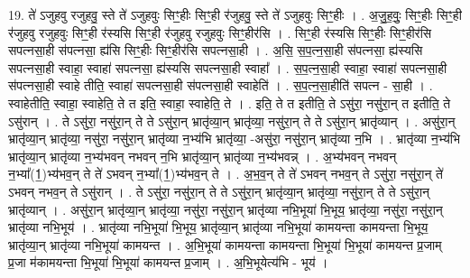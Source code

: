 \documentclass[17pt]{extarticle}
\begin{document}
19. ते॑ ऽजुहवु रजुहवु॒ स्ते ते॑ ऽजुहवुः सिꣳ॒॒हीः सिꣳ॒॒ही र॑जुहवु॒ स्ते ते॑ ऽजुहवुः सिꣳ॒॒हीः । . अ॒जु॒ह॒वुः॒ सिꣳ॒॒हीः सिꣳ॒॒ही र॑जुहवु रजुहवुः सिꣳ॒॒ही र॑स्यसि सिꣳ॒॒ही र॑जुहवु रजुहवुः सिꣳ॒॒हीर॑सि । . सिꣳ॒॒ही र॑स्यसि सिꣳ॒॒हीः सिꣳ॒॒हीर॑सि सपत्नसा॒ही स॑पत्नसा॒ ह्य॑सि सिꣳ॒॒हीः सिꣳ॒॒हीर॑सि सपत्नसा॒ही । . अ॒सि॒ स॒प॒त्न॒सा॒ही स॑पत्नसा॒ ह्य॑स्यसि सपत्नसा॒ही स्वाहा॒ स्वाहा॑ सपत्नसा॒ ह्य॑स्यसि सपत्नसा॒ही स्वाहा᳚ । . स॒प॒त्न॒सा॒ही स्वाहा॒ स्वाहा॑ सपत्नसा॒ही स॑पत्नसा॒ही स्वाहे तीति॒ स्वाहा॑ सपत्नसा॒ही स॑पत्नसा॒ही स्वाहेति॑ । . स॒प॒त्न॒सा॒हीति॑ सपत्न - सा॒ही । . स्वाहेतीति॒ स्वाहा॒ स्वाहेति॒ ते त इति॒ स्वाहा॒ स्वाहेति॒ ते । . इति॒ ते त इतीति॒ ते ऽसु॑रा॒ नसु॑रा॒न् त इतीति॒ ते ऽसु॑रान् । . ते ऽसु॑रा॒ नसु॑रा॒न् ते ते ऽसु॑रा॒न् भ्रातृ॑व्या॒न् भ्रातृ॑व्या॒ नसु॑रा॒न् ते ते ऽसु॑रा॒न् भ्रातृ॑व्यान् । . असु॑रा॒न् भ्रातृ॑व्या॒न् भ्रातृ॑व्या॒ नसु॑रा॒ नसु॑रा॒न् भ्रातृ॑व्या न॒भ्य॑भि भ्रातृ॑व्या॒ -असु॑रा॒ नसु॑रा॒न् भ्रातृ॑व्या न॒भि । . भ्रातृ॑व्या न॒भ्य॑भि भ्रातृ॑व्या॒न् भ्रातृ॑व्या न॒भ्य॑भवन् नभवन् न॒भि भ्रातृ॑व्या॒न् भ्रातृ॑व्या न॒भ्य॑भवन्न् । . अ॒भ्य॑भवन् नभवन् न॒भ्या᳚(1॒)भ्य॑भव॒न् ते ते॑ ऽभवन् न॒भ्या᳚(1॒)भ्य॑भव॒न् ते । . अ॒भ॒व॒न् ते ते॑ ऽभवन् नभव॒न् ते ऽसु॑रा॒ नसु॑रा॒न् ते॑ ऽभवन् नभव॒न् ते ऽसु॑रान् । . ते ऽसु॑रा॒ नसु॑रा॒न् ते ते ऽसु॑रा॒न् भ्रातृ॑व्या॒न् भ्रातृ॑व्या॒ नसु॑रा॒न् ते ते ऽसु॑रा॒न् भ्रातृ॑व्यान् । . असु॑रा॒न् भ्रातृ॑व्या॒न् भ्रातृ॑व्या॒ नसु॑रा॒ नसु॑रा॒न् भ्रातृ॑व्या नभि॒भूया॑ भि॒भूय॒ भ्रातृ॑व्या॒ नसु॑रा॒ नसु॑रा॒न् भ्रातृ॑व्या नभि॒भूय॑ । . भ्रातृ॑व्या नभि॒भूया॑ भि॒भूय॒ भ्रातृ॑व्या॒न् भ्रातृ॑व्या नभि॒भूया॑ कामयन्ता कामयन्ता भि॒भूय॒ भ्रातृ॑व्या॒न् भ्रातृ॑व्या नभि॒भूया॑ कामयन्त । . अ॒भि॒भूया॑ कामयन्ता कामयन्ता भि॒भूया॑ भि॒भूया॑ कामयन्त प्र॒जाम् प्र॒जा म॑कामयन्ता भि॒भूया॑ भि॒भूया॑ कामयन्त प्र॒जाम् । . अ॒भि॒भूयेत्य॑भि - भूय॑ । \newline
\end{document}

